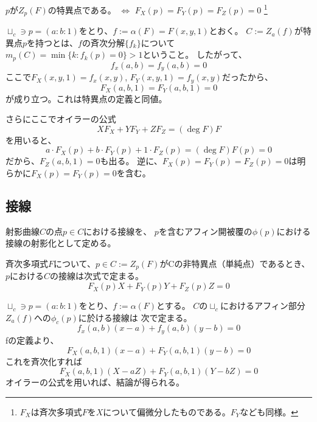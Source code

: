 \documentclass[a4]{article}
\begin{document}
        \begin{Lemma}
            $p$が$Z_p(F)$の特異点である。
            $\iff$ $F_X(p)=F_Y(p)=F_Z(p)=0$
            \footnote{$F_X$は斉次多項式$F$を$X$について偏微分したものである。$F_Y$なども同様。}
        \end{Lemma}
        \begin{Proof}
            $\sqcup_c \ni p=(a:b:1)$をとり、$f:=\alpha(F)=F(x, y, 1)$とおく。
            $C:=Z_a(f)$が特異点$p$を持つとは、$f$の斉次分解$\{ f_k \}$について
            $m_p(C)=\min\{k : f_k(p)=0\}>1$ということ。
            したがって、
            \[ f_x(a,b)=f_y(a,b)=0 \]
            ここで$F_X(x, y, 1)=f_x(x,y)$, $F_Y(x, y, 1)=f_y(x,y)$だったから、
            \[ F_X(a, b, 1)=F_Y(a, b, 1)=0 \]
            が成り立つ。これは特異点の定義と同値。

            さらにここでオイラーの公式\[ XF_X+YF_Y+ZF_Z=(\deg F)F \]を用いると、
            \[ a \cdot F_X(p)+b \cdot F_Y(p)+1 \cdot F_Z(p)=(\deg F)F(p)=0 \]
            だから、$F_Z(a, b, 1)=0$も出る。
            逆に、$F_X(p)=F_Y(p)=F_Z(p)=0$は明らかに$F_X(p)=F_Y(p)=0$を含む。
            \QED
        \end{Proof}

        \subsection{接線}
        \begin{Def}[射影曲線の接線]
            射影曲線$C$の点$p \in C$における接線を、
            $p$を含むアフィン開被覆の$\phi(p)$における接線の射影化として定める。
        \end{Def}

        \begin{Lemma}
            斉次多項式$F$について、$p \in C:=Z_p(F)$がCの非特異点（単純点）であるとき、
            $p$における$C$の接線は次式で定まる。
            \[ F_X(p)X+F_Y(p)Y+F_Z(p)Z=0 \]
        \end{Lemma}
        \begin{Proof}
            $\sqcup_c \ni p=(a:b:1)$をとり、$f:=\alpha(F)$とする。
            $C$の$\sqcup_c$におけるアフィン部分$Z_a(f)$への$\phi_c(p)$に於ける接線は
            次で定まる。
            \[ f_x(a,b)(x-a)+f_y(a,b)(y-b)=0 \]
            fの定義より、
            \[ F_X(a,b,1)(x-a)+F_Y(a,b,1)(y-b)=0 \]
            これを斉次化すれば
            \[ F_X(a,b,1)(X-aZ)+F_Y(a,b,1)(Y-bZ)=0 \]
            オイラーの公式を用いれば、結論が得られる。
        \end{Proof}
\end{document}
